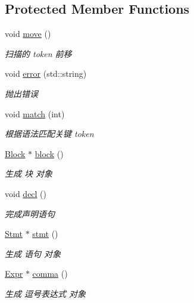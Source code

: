 \subsection*{Protected Member Functions}
\begin{DoxyCompactItemize}
\item 
void \hyperlink{class_parser_ae6cc5bf3ee250c954a36bd16f7559d79}{move} ()
\begin{DoxyCompactList}\small\item\em 扫描的 token 前移 \end{DoxyCompactList}\item 
void \hyperlink{class_parser_a0915f6c61a1a70038a8608ff7a823b5a}{error} (std\+::string)
\begin{DoxyCompactList}\small\item\em 抛出错误 \end{DoxyCompactList}\item 
void \hyperlink{class_parser_a009517efe4fe90b136071179beb32360}{match} (int)
\begin{DoxyCompactList}\small\item\em 根据语法匹配关键 token \end{DoxyCompactList}\item 
\hyperlink{class_block}{Block} $\ast$ \hyperlink{class_parser_a2e96322fd6d40261ab256a726634c1b3}{block} ()
\begin{DoxyCompactList}\small\item\em 生成 块 对象 \end{DoxyCompactList}\item 
void \hyperlink{class_parser_a44a52c6402e86b0a200e02b516f8e9fe}{decl} ()
\begin{DoxyCompactList}\small\item\em 完成声明语句 \end{DoxyCompactList}\item 
\hyperlink{class_stmt}{Stmt} $\ast$ \hyperlink{class_parser_ab1ae72a37dbe2118ab65ad8f4dec4630}{stmt} ()
\begin{DoxyCompactList}\small\item\em 生成 语句 对象 \end{DoxyCompactList}\item 
\hyperlink{class_expr}{Expr} $\ast$ \hyperlink{class_parser_abf18837a6acc9b543969706108d1191f}{comma} ()
\begin{DoxyCompactList}\small\item\em 生成 逗号表达式 对象 \end{DoxyCompactList}\item 

\end{DoxyCompactItemize}
